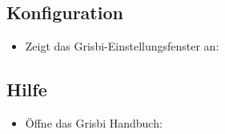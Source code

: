 \subsection{Konfiguration}%

\begin{itemize}
	\item Zeigt das Grisbi-Einstellungsfenster an: 
\end{itemize}


\subsection{Hilfe}%

\begin{itemize}
	\item Öffne das Grisbi Handbuch: 
\end{itemize}













